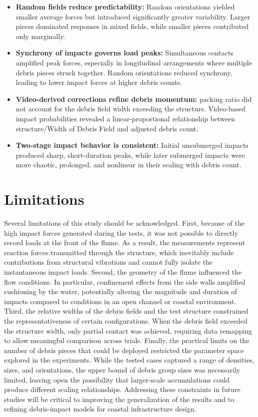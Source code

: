 \documentclass{article}
\begin{document}
{\begin{itemize}
    \item \textbf{Random fields reduce predictability:} Random orientations yielded smaller average forces but introduced significantly greater variability. Larger pieces dominated responses in mixed fields, while smaller pieces contributed only marginally.
   
    \item \textbf{Synchrony of impacts governs load peaks:} Simultaneous contacts amplified peak forces, especially in longitudinal arrangements where multiple debris pieces struck together. Random orientations reduced synchrony, leading to lower impact forces at higher debris counts.
    
    \item \textbf{Video-derived corrections refine debris momentum:} packing ratio did not account for the debris field width exceeding the structure. Video-based impact probabilities revealed a linear-proportional relationship between structure/Width of Debris Field and adjusted debris count. 


    \item \textbf{Two-stage impact behavior is consistent:} Initial unsubmerged impacts produced sharp, short-duration peaks, while later submerged impacts were more chaotic, prolonged, and nonlinear in their scaling with debris count.
\end{itemize}


\section{Limitations}
Several limitations of this study should be acknowledged. First, because of the high impact forces generated during the tests, it was not possible to directly record loads at the front of the flume. As a result, the measurements represent reaction forces transmitted through the structure, which inevitably include contributions from structural vibrations and cannot fully isolate the instantaneous impact loads. Second, the geometry of the flume influenced the flow conditions. In particular, confinement effects from the side walls amplified cushioning by the water, potentially altering the magnitude and duration of impacts compared to conditions in an open channel or coastal environment. Third, the relative widths of the debris fields and the test structure constrained the representativeness of certain configurations. When the debris field exceeded the structure width, only partial contact was achieved, requiring data remapping to allow meaningful comparison across trials. Finally, the practical limits on the number of debris pieces that could be deployed restricted the parameter space explored in the experiments. While the tested cases captured a range of densities, sizes, and orientations, the upper bound of debris group sizes was necessarily limited, leaving open the possibility that larger-scale accumulations could produce different scaling relationships. Addressing these constraints in future studies will be critical to improving the generalization of the results and to refining debris-impact models for coastal infrastructure design.

}
\end{document}

